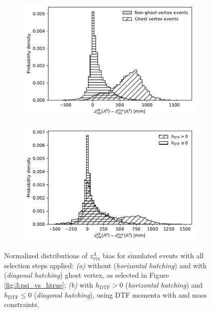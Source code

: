 \begin{figure}[t]
	\centering
	\begin{subfigure}{.45\textwidth}
		\includegraphics[width=\textwidth]{graphics/03-vertex_reconstruction/lambda_endvertex_z_bias_vs_ghost_vertex.pdf}
		\caption{}
		\label{fig:3:bias_without_ghost_vertex}
	\end{subfigure}
	\begin{subfigure}{.45\textwidth}
		\includegraphics[width=\textwidth]{graphics/03-vertex_reconstruction/lambda_endvertex_z_bias_vs_reco_horizontality.pdf}
		\caption{}
		\label{fig:3:bias_without_positive_hDTF}
	\end{subfigure}
	\caption{Normalized distributions of $z_\text{vtx}^\Lambda$ bias for simulated \demonstratorshort events with all selection steps applied: \textit{(a)} without (\textit{horizontal hatching}) and with (\textit{diagonal hatching}) \lz ghost vertex, as selected in Figure \ref{fig:3:psi_vs_htrue}; \textit{(b)} with $h_\text{DTF} > 0$ (\textit{horizontal hatching}) and  $h_\text{DTF} \leq 0$ (\textit{diagonal hatching}), using DTF momenta with \jpsi and \lz mass constraints.}
\end{figure}

